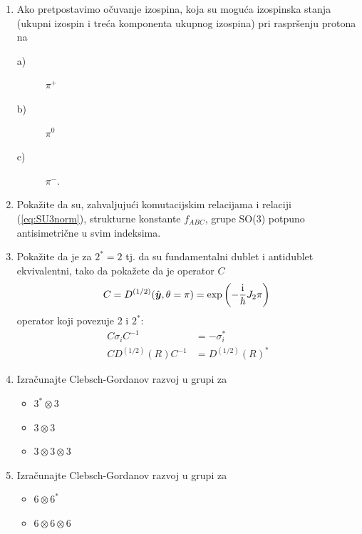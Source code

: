 \begin{enumerate}[label=\arabic{chapter}.\arabic*.]

\item Ako pretpostavimo očuvanje izospina, koja su moguća izospinska
stanja (ukupni izospin i treća komponenta ukupnog izospina) pri
raspršenju protona na

 \begin{description} \item[a)] $\pi^+$
                     \item[b)] $\pi^0$
                     \item[c)] $\pi^-$. \end{description}


\item \label{zad:fabc}
Pokažite da su, zahvaljujući komutacijskim relacijama i relaciji (\ref{eq:SU3norm}),
strukturne konstante $f_{ABC}$, grupe SO(3) potpuno antisimetrične u
svim indeksima.

\item \label{zad:su2dublet}
Pokažite da je za   $2^* = 2$ tj. da su fundamentalni dublet i
antidublet ekvivalentni, tako da pokažete da je operator $C$
\begin{displaymath}
    C = D^{(1/2)}(\hat{\vec{y}},\theta=\pi) = \exp\left(-\frac{\rmi}{\hbar} J_2 \pi\right) \;
\end{displaymath}
operator koji povezuje 2 i $2^*$:
\begin{align*}
C \sigma_i C^{-1}& = - \sigma_{i}^* \\
C D^{(1/2)}(R) C^{-1}& = D^{(1/2)}(R)^*
\end{align*}


\item \label{zad:3x3x3}
Izračunajte Clebsch-Gordanov razvoj u  grupi za
\begin{itemize}
\item $3^* \otimes 3$
\item $3 \otimes 3$
\item $3 \otimes 3 \otimes 3$
\end{itemize}

\item Izračunajte Clebsch-Gordanov razvoj u  grupi za
\begin{itemize}
\item $6 \otimes 6^*$
\item $6 \otimes 6 \otimes 6$
\end{itemize}

\end{enumerate}
